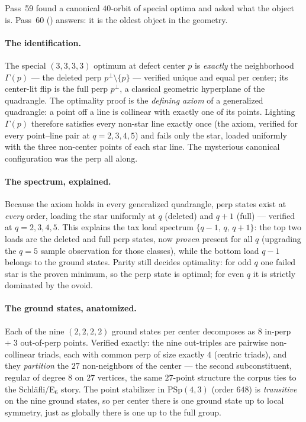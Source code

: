 \documentclass[11pt]{article}
\begin{document}
Pass~59 found a canonical \(40\)-orbit of special optima and asked what the
object is.  Pass~60 () answers: it is the
oldest object in the geometry.

\paragraph{The identification.}  The special \((3,3,3,3)\) optimum at defect
center \(p\) is \emph{exactly} the neighborhood \(\Gamma(p)\) --- the deleted
perp \(p^\perp\setminus\{p\}\) --- verified unique and equal per center; its
center-lit flip is the full perp \(p^\perp\), a classical geometric hyperplane
of the quadrangle.  The optimality proof is the \emph{defining axiom} of a
generalized quadrangle: a point off a line is collinear with exactly one of its
points.  Lighting \(\Gamma(p)\) therefore satisfies every non-star line exactly
once (the axiom, verified for every point--line pair at \(q=2,3,4,5\)) and
fails only the star, loaded uniformly with the three non-center points of each
star line.  The mysterious canonical configuration was the perp all along.

\paragraph{The spectrum, explained.}  Because the axiom holds in every
generalized quadrangle, perp states exist at \emph{every} order, loading the
star uniformly at \(q\) (deleted) and \(q+1\) (full) --- verified at
\(q=2,3,4,5\).  This explains the tax load spectrum \(\{q-1,\,q,\,q+1\}\): the
top two loads are the deleted and full perp states, now \emph{proven} present
for all \(q\) (upgrading the \(q=5\) sample observation for those classes),
while the bottom load \(q-1\) belongs to the ground states.  Parity still
decides optimality: for odd \(q\) one failed star is the proven minimum, so the
perp state is optimal; for even \(q\) it is strictly dominated by the ovoid.

\paragraph{The ground states, anatomized.}  Each of the nine \((2,2,2,2)\)
ground states per center decomposes as \(8\) in-perp \(+\;3\) out-of-perp
points.  Verified exactly: the nine out-triples are pairwise non-collinear
triads, each with common perp of size exactly \(4\) (centric triads), and they
\emph{partition} the \(27\) non-neighbors of the center --- the second
subconstituent, regular of degree \(8\) on \(27\) vertices, the same
\(27\)-point structure the corpus ties to the Schl\"afli/E\(_6\) story.  The
point stabilizer in \(\mathrm{PSp}(4,3)\) (order \(648\)) is \emph{transitive}
on the nine ground states, so per center there is one ground state up to local
symmetry, just as globally there is one up to the full group.
\end{document}
